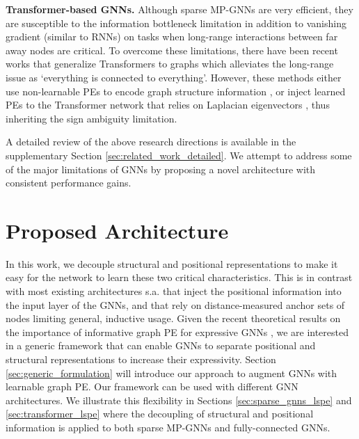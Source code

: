 \documentclass{article} \usepackage{iclr2021_conference,times}
\begin{document}
{\bf Transformer-based GNNs.}
Although sparse MP-GNNs are very efficient, they are susceptible to the information bottleneck limitation \citep{alon2020bottleneck} in addition to vanishing gradient (similar to RNNs) on tasks when long-range interactions between far away nodes are critical. To overcome these limitations, there have been recent works that generalize Transformers to graphs \citep{dwivedi2021generalization, kreuzer2021rethinking, ying2021transformers, mialon2021graphit} which alleviates the long-range issue as `everything is connected to everything'. However, these methods either use non-learnable PEs to encode graph structure information \citep{dwivedi2021generalization, ying2021transformers, mialon2021graphit}, or inject learned PEs to the Transformer network that relies on Laplacian eigenvectors \citep{kreuzer2021rethinking}, thus inheriting the sign ambiguity limitation.


A detailed review of the above research directions is available in the supplementary Section \ref{sec:related_work_detailed}. We attempt to address some of the major limitations of GNNs by proposing a novel architecture with consistent performance gains. 


\section{Proposed Architecture}
\label{sec:proposed_architecture}

In this work, we decouple structural and positional representations to make it easy for the network to learn these two critical characteristics. This is in contrast with most existing architectures s.a. \cite{dwivedi2021generalization,beani2021directional,kreuzer2021rethinking} that inject the positional information into the input layer of the GNNs, and \cite{you2019position} that rely on distance-measured anchor sets of nodes limiting general, inductive usage.
Given the recent theoretical results on the importance of informative graph PE for expressive GNNs \citep{murphy2019relational,srinivasan2019equivalence,Loukas2020What},
we are interested in a generic framework that can enable GNNs to separate positional and structural representations to increase their expressivity.
Section \ref{sec:generic_formulation} will introduce our approach to  augment GNNs with learnable graph PE. Our framework can be used with different GNN architectures. We illustrate this flexibility in Sections \ref{sec:sparse_gnns_lspe} and \ref{sec:transformer_lspe} where the decoupling of structural and positional information is applied to both sparse MP-GNNs and fully-connected GNNs.
\end{document}
